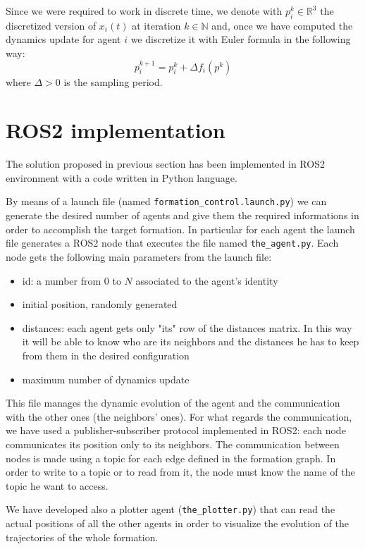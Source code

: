 \documentclass[a4paper,11pt,oneside]{book}
\begin{document}
Since we were required to work in discrete time, we denote with $p_i^k \in \mathbb{R}^3$ the discretized version of $x_i(t)$ at iteration $k \in \mathbb{N}$ and, once we have computed the dynamics update for agent $i$ we discretize it with Euler formula in the following way:
\begin{equation}
p_i^{k+1} = p_i^{k} + \Delta f_i(p^k)
\end{equation}
where $\Delta > 0$ is the sampling period.

\section{ROS2 implementation}
The solution proposed in previous section has been implemented in ROS2 environment with a code written in Python language.

\bigskip
By means of a launch file (named \texttt{formation\_control.launch.py}) we can generate the desired number of agents and give them the required informations in order to accomplish the target formation. In particular for each agent the launch file generates a ROS2 node that executes the file named \texttt{the\_agent.py}. Each node gets the following main parameters from the launch file:
\begin{itemize}
\item id: a number from $0$ to $N$ associated to the agent's identity
\item initial position, randomly generated
\item distances: each agent gets only "its" row of the distances matrix. In this way it will be able to know who are its neighbors and the distances he has to keep from them in the desired configuration
\item maximum number of dynamics update
\end{itemize}
This file manages the dynamic evolution of the agent and the communication with the other ones (the neighbors' ones). For what regards the communication, we have used a publisher-subscriber protocol implemented in ROS2: each node communicates its position only to its neighbors. The communication between nodes is made using a topic for each edge defined in the formation graph. In order to write to a topic or to read from it, the node must know the name of the topic he want to access.

\bigskip
We have developed also a plotter agent (\texttt{the\_plotter.py}) that can read the actual positions of all the other agents in order to visualize the evolution of the trajectories of the whole formation.
\end{document}
